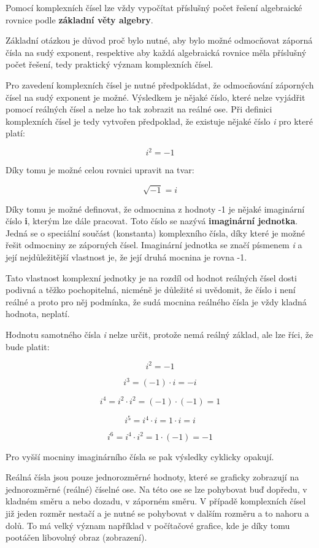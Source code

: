 Pomocí komplexních čísel lze vždy vypočítat příslušný počet řešení algebraické rovnice podle {\bf základní věty algebry}.

Základní otázkou je důvod proč bylo nutné, aby bylo možné odmocňovat záporná čísla na sudý exponent, respektive aby každá algebraická rovnice měla příslušný počet řešení, tedy praktický význam komplexních čísel. 


Pro zavedení komplexních čísel je nutné předpokládat, že odmocňování záporných čísel na sudý exponent je možné. Výsledkem je nějaké číslo, které nelze vyjádřit pomocí reálných čísel a nelze ho tak zobrazit na reálné ose. Při definici komplexních čísel je tedy vytvořen předpoklad, že existuje nějaké číslo {\it i} pro které platí:

$$ i^2 = -1 $$

Díky tomu je možné celou rovnici upravit na tvar:

$$ \sqrt{-1} = i$$

Díky tomu je možné definovat, že odmocnina z hodnoty -1 je nějaké imaginární číslo {\bf i}, kterým lze dále pracovat. Toto číslo se nazývá {\bf imaginární jednotka}.  Jedná se o speciální součást (konstanta) komplexního čísla, díky které je možné řešit odmocniny ze záporných čísel. Imaginární jednotka se značí písmenem {\it i} a její nejdůležitější vlastnost je,  že její druhá mocnina je rovna -1. 

Tato vlastnost komplexní jednotky je na rozdíl od hodnot reálných čísel dosti podivná a těžko pochopitelná, nicméně je důležité si uvědomit, že číslo i není reálné a proto pro něj podmínka, že sudá mocnina reálného čísla je vždy kladná hodnota, neplatí.

Hodnotu samotného čísla {\it i} nelze určit, protože nemá reálný základ, ale lze říci, že bude platit:

$$ i^2 = -1 $$

$$ i^3 = (-1) \cdot i = -i $$

$$ i^4 = i^2 \cdot i^2 = (-1) \cdot (-1) = 1 $$

$$ i^5 = i^4 \cdot i = 1 \cdot i = i $$

$$ i^6 = i^4 \cdot i^2 = 1 \cdot (-1) = -1 $$


Pro vyšší mocniny imaginárního čísla se pak výsledky cyklicky opakují.


Reálná čísla jsou pouze jednorozměrné hodnoty, které se graficky zobrazují na jednorozměrné (reálné) číselné ose. Na této  ose se lze pohybovat buď dopředu, v kladném směru a nebo dozadu, v záporném směru. V případě komplexních čísel již jeden rozměr nestačí a je nutné se pohybovat v dalším rozměru a to nahoru a dolů. To má velký význam například v počítačové grafice, kde je díky tomu pootáčen libovolný obraz (zobrazení). 

